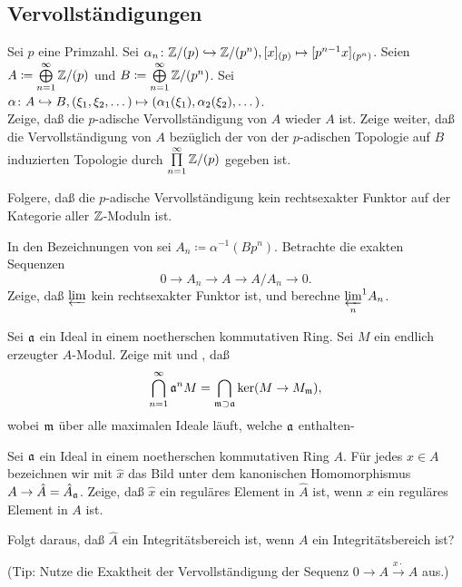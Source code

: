 \subsection{Vervollständigungen}

\begin{exercise}
	\label{exer:compl_not_right_exact}
	Sei \(p\) eine Primzahl. Sei \(\alpha_n\colon \mathbb Z/(p) \hookrightarrow \mathbb Z/(p^n), [x]_{(p)} \mapsto [p^{n - 1} x]_{(p^n)}\).
	Seien \(A \coloneqq \bigoplus\limits_{n = 1}^\infty \mathbb Z/(p)\) und \(B \coloneqq \bigoplus\limits_{n = 1}^\infty \mathbb Z/(p^n)\).
	Sei \(\alpha\colon A \hookrightarrow B, (\xi_1, \xi_2, \dotsc) \mapsto (\alpha_1(\xi_1), \alpha_2(\xi_2), \dotsc)\).
	\\
	Zeige, daß die \(p\)-adische Vervollständigung von \(A\) wieder \(A\) ist.
	Zeige weiter, daß die Vervollständigung von \(A\) bezüglich der von der \(p\)-adischen Topologie auf \(B\) induzierten Topologie
	durch \(\prod\limits_{n = 1}^\infty \mathbb Z/(p)\) gegeben ist.
	
	Folgere, daß die \(p\)-adische Vervollständigung kein rechtsexakter Funktor auf der Kategorie aller \(\mathbb Z\)-Moduln ist.
\end{exercise}

\begin{exercise}
	In den Bezeichnungen von  sei \(A_n \coloneqq \alpha^{-1} (B p^n)\). Betrachte die
	exakten Sequenzen
	\[
		0 \to A_n \to A \to A/A_n \to 0.
	\]
	Zeige, daß \(\varprojlim\) kein rechtsexakter Funktor ist, und berechne \({\varprojlim\limits_n}^1 A_n\).
\end{exercise}

\begin{exercise}
	Sei \(\mathfrak{a}\) ein Ideal in einem noetherschen kommutativen Ring. Sei \(M\) ein endlich erzeugter \(A\)-Modul.
	Zeige mit  und , daß
	\[
		\bigcap\limits_{n = 1}^\infty \mathfrak{a}^n M = \bigcap\limits_{\mathfrak{m} \supset \mathfrak{a}} \ker(M \to M_{\mathfrak{m}}),
	\]
	wobei \(\mathfrak{m}\) über alle maximalen Ideale läuft, welche \(\mathfrak{a}\) enthalten-
\end{exercise}

\begin{exercise}
	Sei \(\mathfrak{a}\) ein Ideal in einem noetherschen kommutativen Ring \(A\). Für jedes \(x \in A\) bezeichnen wir mit
	\(\hat x\) das Bild unter dem kanonischen Homomorphismus \(A \to \hat A = \hat A_{\mathfrak{a}}\). Zeige, daß \(\hat x\) ein
	reguläres Element in \(\hat A\) ist, wenn \(x\) ein reguläres Element in \(A\) ist.
	
	Folgt daraus, daß \(\hat A\) ein Integritätsbereich ist, wenn \(A\) ein Integritätsbereich ist?
	
	(Tip: Nutze die Exaktheit der Vervollständigung der Sequenz \(0 \to A \xrightarrow{x \cdot} A\) aus.)
\end{exercise}

